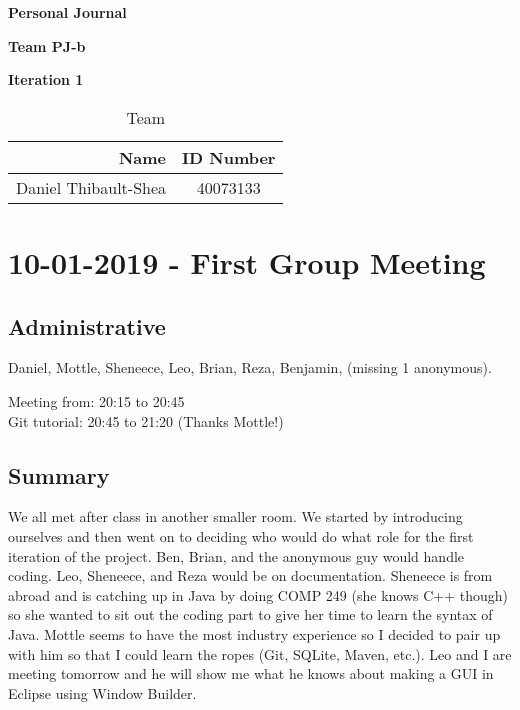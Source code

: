 \documentclass[12pt]{article}
\begin{document}
\vspace*{0.5in}
\centerline{\bf\Large Personal Journal}

\vspace*{0.5in}
\centerline{\bf\Large Team PJ-b}
\vspace*{0.25in}
\centerline{\bf\Large Iteration 1}


\vspace*{1.5in}
\begin{table}[htbp]
\caption{Team}
\begin{center}
\begin{tabular}{|r | c|}
\hline
Name & ID Number \\
\hline\hline
Daniel Thibault-Shea & 40073133 \\
\hline
\end{tabular}
\end{center}
\end{table}

\clearpage

\section{10-01-2019 - First Group Meeting}

\subsection{Administrative}
Daniel, Mottle, Sheneece, Leo, Brian, Reza, Benjamin, (missing 1 anonymous).

Meeting from: 20:15 to 20:45\\
Git tutorial: 20:45 to 21:20 (Thanks Mottle!)

\subsection{Summary}
We all met after class in another smaller room. We started by introducing ourselves and then went on to deciding who would do what role for the first iteration of the project. Ben, Brian, and the anonymous guy would handle coding. Leo, Sheneece, and Reza would be on documentation. Sheneece is from abroad and is catching up in Java by doing COMP 249 (she knows C++ though) so she wanted to sit out the coding part to give her time to learn the syntax of Java. Mottle seems to have the most industry experience so I decided to pair up with him so that I could learn the ropes (Git, SQLite, Maven, etc.). Leo and I are meeting tomorrow and he will show me what he knows about making a GUI in Eclipse using Window Builder.
\end{document}
